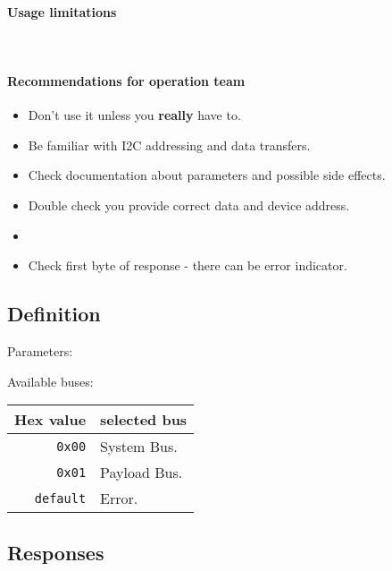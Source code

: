 \paragraph{Usage limitations}\mbox{}\\ 
\None

\paragraph{Recommendations for operation team}
\begin{itemize}
    \item Don't use it unless you \textbf{really} have to.
    \item Be familiar with I2C addressing and data transfers.
    \item Check documentation about parameters and possible side effects.
	\item Double check you provide correct data and device address.
	\item {}
	\item Check first byte of response - there can be error indicator.
\end{itemize}

\subsection{Definition}

Parameters: 

\begin{tcarglist}
\end{tcarglist}

Available buses:

\begin{tabular}{r | l}
	Hex value & selected bus \\ \hline
	\texttt{0x00} & System Bus. \\
	\texttt{0x01} & Payload Bus. \\
	\texttt{default} & Error. 
\end{tabular}

\subsection{Responses}

